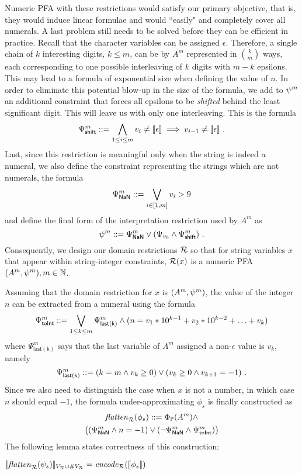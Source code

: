 \documentclass[sigplan,screen]{acmart}
\begin{document}
Numeric PFA with these restrictions would satisfy our primary objective, that is, they would induce linear formulae and would ``easily" and completely cover all numerals.
%
A last problem still needs to be solved before they can be efficient in practice. 
%
Recall that the character variables can be assigned $\epsilon$.  
%
Therefore, a single chain of $k$ interesting digits, $k\leq m$, can be by $A^m$ represented in $k\choose m$ ways, each corresponding to one possible interleaving of $k$ digits with $m-k$ epsilons. 
%
%
This may  lead to a formula of   exponential size  when defining  the value of $n$.
%
In order to eliminate this potential blow-up in the size of the formula, we add to $\psi^m$ an additional constraint that forces all epsilons to be \emph{shifted} behind the least significant digit. This will leave us with only one interleaving. This is the formula
$$
\Psi_{\mathsf{shift}}^m ::= \bigwedge_{1\leq i \leq m} v_i \neq [\![\epsilon]\!] \implies v_{i-1}\neq [\![\epsilon]\!] \ .
$$
Last, since this restriction is meaningful only when the string is indeed a numeral,  
we also define the constraint representing the strings which are not numerals, the formula
$$
\Psi_{\mathsf{NaN}}^m ::=  \bigvee_{i\in [1,m]} v_i>9
$$ 
and define the final form of the interpretation restriction used by $A^m$ as 
$$
\psi^m ::=  \Psi_{\mathsf{NaN}}^m \lor (\Psi_{v_0} \land \Psi_{\mathsf{shift}}^m)\ .
$$
Consequently, we design our domain restrictions $\mathcal{R}$ so that for string variables $x$ that appear within string-integer constraints,  $\mathcal{R}(x)$ is a numeric PFA $(A^m,\psi^m),m\in \mathbb{N}$. 

Assuming that the domain restriction for $x$ is $(A^m,\psi^m)$, 
the value of the integer $n$ can be extracted from a numeral using the formula
$$
\Psi_{\mathsf{toInt}}^m::= \bigvee_{1\leq k \leq m} \Psi_{\mathsf{last(k)}}^m \land (n = v_1* 10^{k-1} + v_2* 10^{k-2} + \ldots + v_{k})
$$
where $\Psi_{\mathsf{last(k)}}^m$ says that the last variable of $A^m$ assigned a non-$\epsilon$ value is $v_{k}$, namely 
$$
\Psi_{\mathsf{last(k)}}^m ::= (k = m \land v_k \geq 0) \lor (v_{k} \geq 0 \land v_{k+1} = -1)\ .
$$
Since we also need to distinguish the case when $x$ is not a number, in which case $n$ should equal $-1$, 
the formula under-approximating $\phi_s$ is finally constructed as  
\begin{multline*}
\mathit{flatten}_{\mathcal{R}}(\phi_s) 
::= 
\Phi_{\mathbb{P}}(A^m) 
\land \\
\bigl((\Psi_{\mathsf{NaN}}^m \land n = -1) 
\lor 
(\neg\Psi_{\mathsf{NaN}}^m \land \Psi_{\mathsf{toInt}}^m)\bigr)
\end{multline*}
The following lemma states correctness of this construction:
\begin{lemma}
$
[\![\mathit{flatten}_{\mathcal{R}}(\psi_s) ]\!]_{V_{\mathcal{R}} \cup \#V_{\mathcal{R}}} = \mathit{encode}_{\mathcal{R}}([\![\phi_s]\!])
$
\end{lemma}
\end{document}
